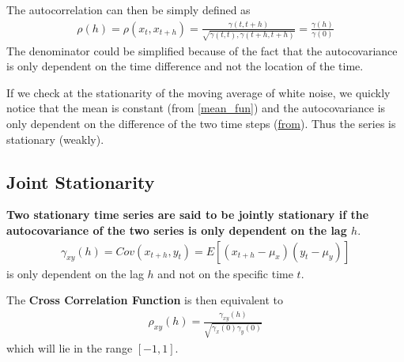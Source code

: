 \documentclass[../time_series_notes.tex]{subfiles}
\begin{document}
    The autocorrelation can then be simply defined as
    \begin{align*}
        \rho (h) = \rho(x_{t}, x_{t+h}) = \frac{\gamma (t,t+h)}{\sqrt{\gamma(t, t), \gamma(t+h, t+h)}} = \frac{\gamma(h)}{\gamma(0)}
    \end{align*}
    The denominator could be simplified because of the fact that the autocovariance is only dependent on the time difference and not the location of the time.\newline

    If we check at the stationarity of the moving average of white noise, we quickly notice that the mean is constant (from \ref{mean_fun}) and the autocovariance is only dependent on the difference of the two time steps (\hyperlink{ma_noise_cov}{from}). Thus the series is stationary (weakly).

    \subsection{Joint Stationarity}
    \textbf{Two stationary time series are said to be jointly stationary if the autocovariance of the two series is only dependent on the lag $h$}.\newline
    \begin{align*}
        \gamma_{xy}(h) = Cov(x_{t+h}, y_{t}) = E[(x_{t+h} - \mu_{x})(y_{t} - \mu_{y})]
    \end{align*}
    is only dependent on the lag $h$ and not on the specific time $t$.\newline

    The \textbf{Cross Correlation Function} is then equivalent to
    \begin{align*}
        \rho_{xy}(h) = \frac{\gamma_{xy}(h)}{\sqrt{\gamma_{x}(0) \gamma_{y}(0)}}
    \end{align*}
    which will lie in the range $[-1,1]$.
\end{document}
